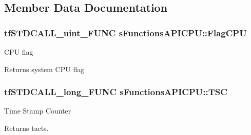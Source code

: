 \subsection{Member Data Documentation}
\hypertarget{structs_functions_a_p_i_c_p_u_ab1c61ff3aee9a874c17d59b20c2c271a}{
\subsubsection[{Flag\-C\-P\-U}]{\setlength{\rightskip}{0pt plus 5cm}tf\-S\-T\-D\-C\-A\-L\-L\-\_\-uint\-\_\-\-F\-U\-N\-C s\-Functions\-A\-P\-I\-C\-P\-U\-::\-Flag\-C\-P\-U}}\label{structs_functions_a_p_i_c_p_u_ab1c61ff3aee9a874c17d59b20c2c271a}
C\-P\-U flag \begin{DoxyReturn}{Returns}
system C\-P\-U flag 
\end{DoxyReturn}
\hypertarget{structs_functions_a_p_i_c_p_u_ac0aa0c19a2331cf952d15fcb7b184788}{
\subsubsection[{T\-S\-C}]{\setlength{\rightskip}{0pt plus 5cm}tf\-S\-T\-D\-C\-A\-L\-L\-\_\-long\-\_\-\-F\-U\-N\-C s\-Functions\-A\-P\-I\-C\-P\-U\-::\-T\-S\-C}}\label{structs_functions_a_p_i_c_p_u_ac0aa0c19a2331cf952d15fcb7b184788}
Time Stamp Counter \begin{DoxyReturn}{Returns}
tacts. 
\end{DoxyReturn}
